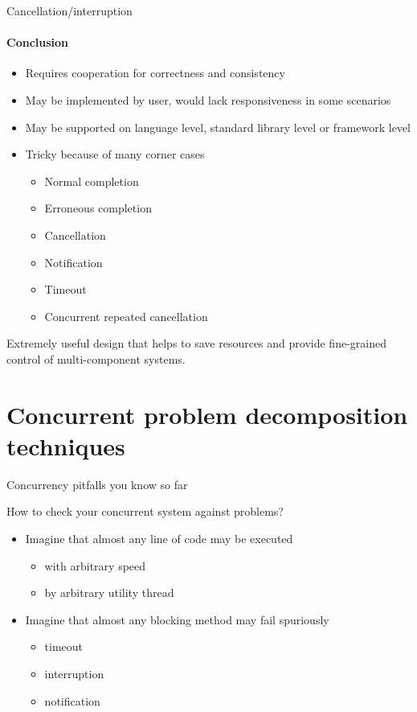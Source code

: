 \begin{frame}{Cancellation/interruption}
\framesubtitle{Conclusion}

\begin{itemize}
    \item Requires cooperation for correctness and consistency
    \item May be implemented by user, would lack responsiveness in some scenarios
    \item May be supported on language level, standard library level or framework level
    \item Tricky because of many corner cases
    \begin{itemize}
        \item Normal completion
        \item Erroneous completion
        \item Cancellation
        \item Notification
        \item Timeout
        \item Concurrent repeated cancellation
    \end{itemize}
\end{itemize}

Extremely useful design that helps to save resources and provide fine-grained control of multi-component systems.

\end{frame}

\section{Concurrent problem decomposition techniques}
\showTOC

\begin{frame}[fragile]{Concurrency pitfalls you know so far}

How to check your concurrent system against problems?

\pause

\begin{itemize}
    \item Imagine that almost any line of code may be executed 
    \begin{itemize}
      \item with arbitrary speed
      \item by arbitrary utility thread
    \end{itemize} 
    \item Imagine that almost any blocking method may fail spuriously 
    \begin{itemize}
        \item timeout
        \item interruption
        \item notification
    \end{itemize} 
\end{itemize} 

\end{frame}


